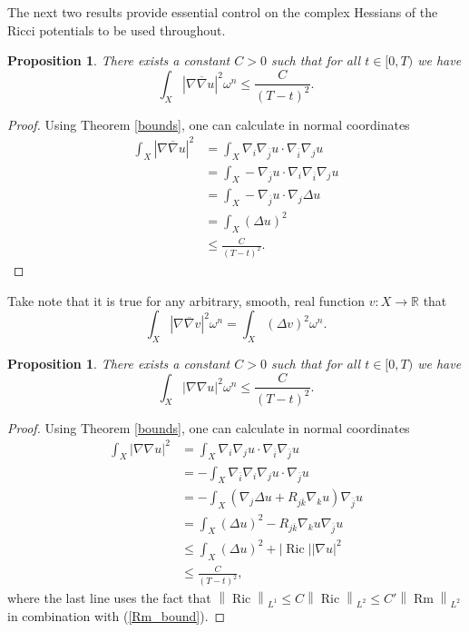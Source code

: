 \documentclass[12pt]{article}
\newtheorem{proposition}[theorem]{Proposition}
\numberwithin{equation}{section}
\newcommand{\R}{\mathbb{R}}
\DeclareMathOperator{\Ric}{Ric}
\DeclareMathOperator{\Rm}{Rm}
\newcommand{\oo}[1]{\overline{#1}}
\newcommand{\norm}[1]{\left\|#1\right\|}
\begin{document}
\noindent The next two results provide essential control on the complex Hessians of the Ricci potentials to be used throughout.

\begin{proposition}\label{L2_mixed_hessian_bound}
There exists a constant $C > 0$ such that for all $t \in [0,T)$ we have
\begin{equation*}
    \int_X |\nabla \oo{\nabla} u|^2 \omega^n \leq \frac{C}{(T-t)^2}.
\end{equation*}
\end{proposition}

\begin{proof}
Using Theorem \ref{bounds}, one can calculate in normal coordinates
\begin{align*}
    \int_X |\nabla \oo{\nabla} u|^2 &= \int_X \nabla_i \nabla_{\oo{j}} u \cdot \nabla_{\oo{i}} \nabla_{j}  u\\
    &= \int_X -\nabla_{\oo{j}} u \cdot \nabla_i \nabla_{\oo{i}} \nabla_{j} u\\
    &= \int_X - \nabla_{\oo{j}} u \cdot \nabla_j \Delta u\\
    &= \int_X (\Delta u)^2\\
    &\leq \frac{C}{(T-t)^2}.
\end{align*}
\end{proof}

\noindent Take note that it is true for any arbitrary, smooth, real function $v : X \to \R$ that
\begin{equation*}
    \int_X |\nabla \oo{\nabla} v|^2 \omega^n = \int_X (\Delta v)^2 \omega^n.
\end{equation*}

\begin{proposition}\label{L2_unmixed_hessian_bound}
There exists a constant $C > 0$ such that for all $t \in [0,T)$ we have
\begin{equation*}
    \int_X |\nabla \nabla u|^2 \omega^n \leq \frac{C}{(T-t)^2}.
\end{equation*}
\end{proposition}

{\allowdisplaybreaks
\begin{proof}
Using Theorem \ref{bounds}, one can calculate in normal coordinates
\begin{align*}
    \int_X |\nabla \nabla u|^2 &= \int_X \nabla_i \nabla_j u \cdot \nabla_{\oo{i}} \nabla_{\oo{j}} u\\
    &= -\int_X \nabla_{\oo{i}} \nabla_i \nabla_j u \cdot \nabla_{\oo{j}} u\\
    &= -\int_X (\nabla_j \Delta u +  R_{j\oo{k}}\nabla_k u) \nabla_{\oo{j}} u\\
    &= \int_X (\Delta u)^2 - R_{j\oo{k}} \nabla_k u \nabla_{\oo{j}} u\\
    &\leq \int_X (\Delta u)^2 + |\Ric| |\nabla u|^2\\
    &\leq \frac{C}{(T-t)^2},
\end{align*}
where the last line uses the fact that $\norm{\Ric}_{L^1} \leq C\norm{\Ric}_{L^2} \leq C' \norm{\Rm}_{L^2}$ in combination with (\ref{Rm_bound}).
\end{proof}
}
\end{document}
